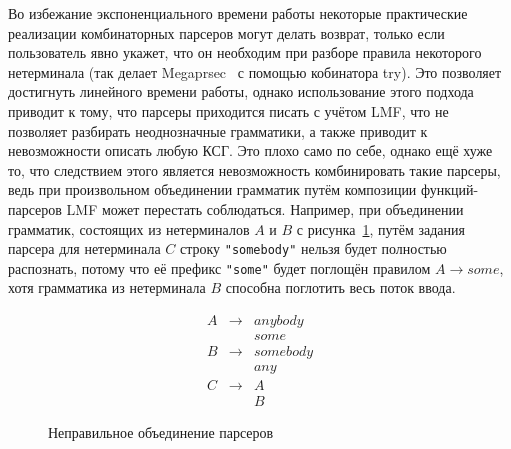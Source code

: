 \documentclass[times]{itmo-student-thesis}
\begin{document}
Во избежание экспоненциального времени работы некоторые практические реализации комбинаторных парсеров могут делать
возврат, только если пользователь явно укажет, что он необходим при разборе правила некоторого нетерминала (так
делает Megaprsec~\cite{noauthor_megaparsec_nodate} с помощью кобинатора try). Это позволяет достигнуть линейного времени работы,
однако использование этого подхода приводит к тому, что парсеры приходится писать с учётом LMF, что не
позволяет разбирать неоднозначные грамматики, а также приводит к невозможности описать любую КСГ. Это плохо само по
себе, однако ещё хуже то, что следствием этого является невозможность комбинировать такие парсеры, ведь при
произвольном объединении грамматик путём композиции функций-парсеров LMF может перестать
соблюдаться. Например, при объединении грамматик, состоящих из нетерминалов $A$ и
$B$ с рисунка~\ref{uncomposable_grammar}, путём задания парсера для нетерминала $C$ строку
\lstinline|"somebody"| нельзя будет полностью распознать, потому что её префикс \lstinline|"some"| будет поглощён правилом
$A \to some$, хотя грамматика из нетерминала $B$ способна поглотить весь поток ввода.

\begin{figure}[!h]
    \caption{Неправильное объединение парсеров}\label{uncomposable_grammar}
    \[
        \begin{array}{lll}
            A & \to & anybody \\
              &     & some  \\
            B & \to & somebody \\
              &     & any  \\
            C & \to & A  \\
              &     & B
        \end{array}
    \]
\end{figure}
\end{document}

